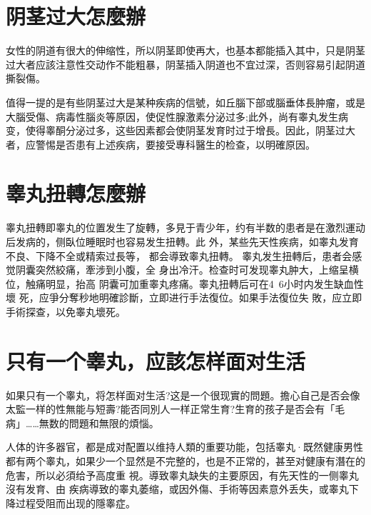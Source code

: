 \documentclass[12pt,UTF8]{ctexbook}
\begin{document}
\section{阴茎过大怎麼辦}

女性的阴道有很大的伸缩性，所以阴茎即使再大，也基本都能插入其中，只是阴茎过大者应該注意性交动作不能粗暴，阴茎插入阴道也不宜过深，否则容易引起阴道撕裂傷。

值得一提的是有些阴茎过大是某种疾病的信號，如丘腦下部或腦垂体長肿瘤，或是大腦受傷、病毒性腦炎等原因，使促性腺激素分泌过多;此外，尚有睾丸发生病变，使得睾酮分泌过多，这些因素都会使阴茎发育时过于增長。因此，阴茎过大者，应警惕是否患有上述疾病，要接受專科醫生的检查，以明確原因。

\section{睾丸扭轉怎麼辦}

睾丸扭轉即睾丸的位置发生了旋轉，多見于青少年，约有半数的患者是在激烈運动后发病的，侧臥位睡眠时也容易发生扭轉。此
外，某些先天性疾病，如睾丸发育不良、下降不全或精索过長等，
都会導致睾丸扭轉。
睾丸发生扭轉后，患者会感觉阴囊突然絞痛，牽涉到小腹，全
身出冷汗。检查时可发现睾丸肿大，上缩呈横位，触痛明显，抬高
阴囊可加重睾丸疼痛。睾丸扭轉后可在4~6小时内发生缺血性壞
死，应爭分奪秒地明確診斷，立即进行手法復位。如果手法復位失
敗，应立即手術探查，以免睾丸壞死。

\section{只有一个睾丸，应該怎样面对生活}

如果只有一个睾丸，将怎样面对生活?这是一个很现實的問題。擔心自己是否会像太監一样的性無能与短壽?能否同別人一样正常生育?生育的孩子是否会有「毛病」……無数的問題和無限的煩惱。

人体的许多器官，都是成对配置以维持人類的重要功能，包括睾丸·既然健康男性都有两个睾丸，如果少一个显然是不完整的，也是不正常的，甚至对健康有潛在的危害，所以必須给予高度重
視。導致睾丸缺失的主要原因，有先天性的一侧睾丸沒有发育、由
疾病導致的睾丸萎缩，或因外傷、手術等因素意外丢失，或睾丸下
降过程受阻而出现的隱睾症。
\end{document}
